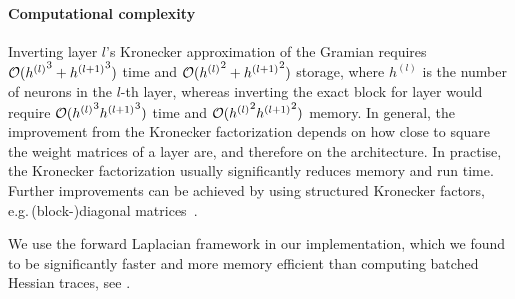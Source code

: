 \paragraph{Computational complexity}
Inverting layer $l$'s Kronecker approximation of the Gramian requires ${\mathcal{O}}({h^{(l)}}^3+{h^{(l+1)}}^3)$ time and ${\mathcal{O}}({h^{(l)}}^2+{h^{(l+1)}}^2)$ storage, where $h^{(l)}$ is the number of neurons in the $l$-th layer, whereas inverting the exact block for layer would require ${\mathcal{O}}({h^{(l)}}^3{h^{(l+1)}}^3)$ time and ${\mathcal{O}}({h^{(l)}}^2 {h^{(l+1)}}^2)$ memory.
In general, the improvement from the Kronecker factorization depends on how close to square the weight matrices of a layer are, and therefore on the architecture.
In practise, the Kronecker factorization usually significantly reduces memory and run time.
Further improvements can be achieved by using structured Kronecker factors, e.g.\,(block-)diagonal matrices~\cite{lin2023structured}.

We use the forward Laplacian framework in our implementation, which we found to be significantly faster and more memory efficient than computing batched Hessian traces, see .


